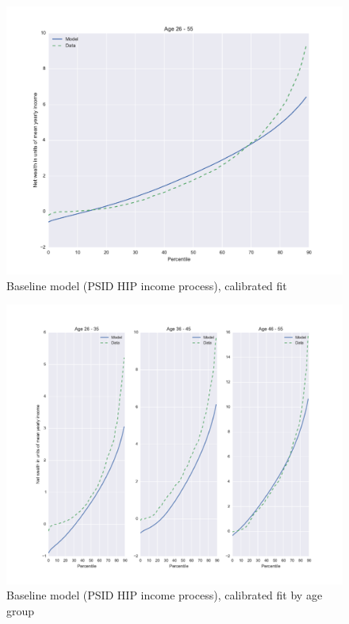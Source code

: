 \begin{figure}
\includegraphics[width=\columnwidth]{baseline}
\caption{Baseline model (PSID HIP income process), calibrated fit}
\label{fig:baseline}
\end{figure}

\begin{figure}
\includegraphics[width=\columnwidth]{baseline_agedetail}
\caption{Baseline model (PSID HIP income process), calibrated fit by age group}
\label{fig:baseline_agedetail}
\end{figure}


